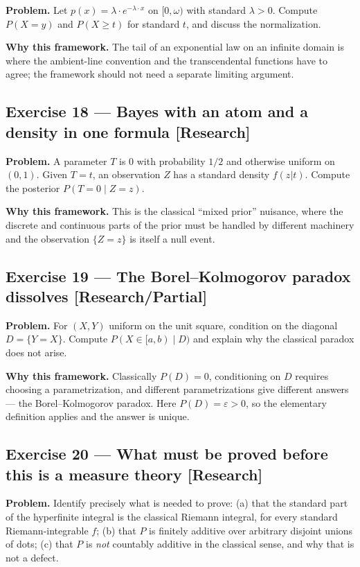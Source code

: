 \documentclass[11pt]{article}
\newcommand{\eps}{\varepsilon}
\begin{document}
\textbf{Problem.} Let $p(x) = \lambda\cdot e^{-\lambda\cdot x}$ on $[0, \omega)$ with standard
$\lambda > 0$. Compute $P(X = y)$ and $P(X \ge  t)$ for standard $t$, and discuss
the normalization.

\textbf{Why this framework.} The tail of an exponential law on an infinite domain
is where the ambient-line convention and the transcendental functions have to
agree; the framework should not need a separate limiting argument.


\subsection*{Exercise 18 --- Bayes with an atom and a density in one formula \hfill \normalfont\small[Research]}

\textbf{Problem.} A parameter $T$ is $0$ with probability $1/2$ and otherwise
uniform on $(0,1)$. Given $T = t$, an observation $Z$ has a standard density
$f(z | t)$. Compute the posterior $P(T = 0\mid Z = z)$.

\textbf{Why this framework.} This is the classical ``mixed prior'' nuisance, where
the discrete and continuous parts of the prior must be handled by different
machinery and the observation $\{Z = z\}$ is itself a null event.


\subsection*{Exercise 19 --- The Borel--Kolmogorov paradox dissolves \hfill \normalfont\small[Research/Partial]}

\textbf{Problem.} For $(X,Y)$ uniform on the unit square, condition on the diagonal
$D = \{Y = X\}$. Compute $P(X\in [a,b)\mid D)$ and explain why the classical
paradox does not arise.

\textbf{Why this framework.} Classically $P(D) = 0$, conditioning on $D$ requires
choosing a parametrization, and different parametrizations give different
answers --- the Borel--Kolmogorov paradox. Here $P(D) = \eps > 0$, so the
elementary definition applies and the answer is unique.


\subsection*{Exercise 20 --- What must be proved before this is a measure theory \hfill \normalfont\small[Research]}

\textbf{Problem.} Identify precisely what is needed to prove: (a) that the standard
part of the hyperfinite integral is the classical Riemann integral, for every
standard Riemann-integrable $f$; (b) that $P$ is finitely additive over arbitrary disjoint unions of dots;
(c) that $P$ is \emph{not} countably additive in the classical sense, and why that
is not a defect.
\end{document}
